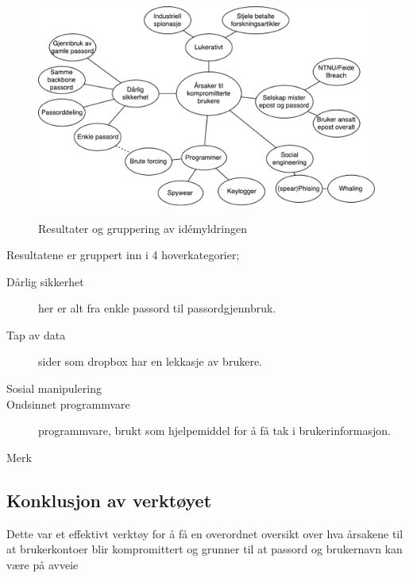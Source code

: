 \begin{figure}[H]
    \centering
    \includegraphics[scale=0.7]{case_2/bilder/idemyldring}
    \label{fig:idemyldring}
    \caption[Idémyldring]{Resultater og gruppering av idémyldringen}
\end{figure}

Resultatene er gruppert inn i 4 hoverkategorier;
\begin{description}
    \item[Dårlig sikkerhet] her er alt fra enkle passord til passordgjennbruk.
    \item [Tap av data] sider som dropbox har en lekkasje av brukere.
    \item[Sosial manipulering] 
    \item [Ondsinnet programmvare] programmvare, brukt som hjelpemiddel for å få tak i brukerinformasjon.
\end{description}
Merk 
\subsection{Konklusjon av verktøyet}
Dette var et effektivt verktøy for å få en overordnet oversikt over hva årsakene til at brukerkontoer blir kompromittert og grunner til at passord og brukernavn kan være på avveie